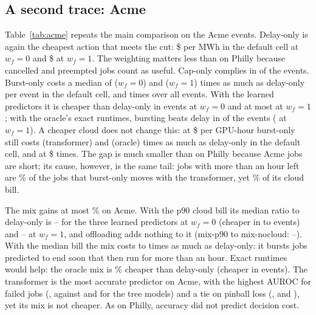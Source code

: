 \subsection{A second trace: Acme}
\label{sec:acme}

Table~\ref{tab:acme} repeats the main comparison on the \AcmeEvents{} Acme events. Delay-only is again the cheapest action that meets the cut: \$\AcmeDefDelayUsdZero{} per MWh in the default cell at $w_f=0$ and \$\AcmeDefDelayUsdOne{} at $w_f=1$. The weighting matters less than on Philly because cancelled and preempted jobs count as useful. Cap-only complies in \AcmeCapCompliantEvents{} of the \AcmeEvents{} events.
Burst-only costs a median of \AcmeBurstOverDelayDefaultZero{} ($w_f=0$) and \AcmeBurstOverDelayDefaultOne{} ($w_f=1$) times as much as delay-only per event in the default cell, and \AcmeBurstOverDelayAllZero{} times over all events. With the learned predictors it is cheaper than delay-only in \AcmeLearnedBurstCheaperMaxZero{} events at $w_f=0$ and at most \AcmeLearnedBurstCheaperMaxOne{} at $w_f=1$; with the oracle's exact runtimes, bursting beats delay in \AcmeOracleBurstCheaperZero{} of the \AcmeEvents{} events (\AcmeOracleBurstCheaperOne{} at $w_f=1$). A cheaper cloud does not change this: at \$\AcmeCheapPrice{} per GPU-hour burst-only still costs \AcmeCheapBurstTransformerOverDelayZero{} (transformer) and \AcmeCheapBurstOracleOverDelayZero{} (oracle) times as much as delay-only in the default cell, and at \$\AcmeHighPrice{} \AcmeHighBurstTransformerOverDelayZero{} times.
The gap is much smaller than on Philly because Acme jobs are short; its cause, however, is the same tail: jobs with more than an hour left are \AcmeBurstLongJobsPct\% of the jobs that burst-only moves with the transformer, yet \AcmeBurstLongUsdPct\% of its cloud bill.

The mix gains at most \AcmeLearnedMixGainMaxPct\% on Acme. With the p90 cloud bill its median ratio to delay-only is \AcmeLearnedMixMinZero{}--\AcmeLearnedMixMaxZero{} for the three learned predictors at $w_f=0$ (cheaper in \AcmeLearnedMixCheaperMinZero{} to \AcmeLearnedMixCheaperMaxZero{} events) and \AcmeLearnedMixMinOne{}--\AcmeLearnedMixMaxOne{} at $w_f=1$, and offloading adds nothing to it (mix-p90 to mix-nocloud: \AcmeLearnedNocloudMinZero{}--\AcmeLearnedNocloudMaxZero{}). With the median bill the mix costs \AcmeLearnedMixPFiveMinZero{} to \AcmeLearnedMixPFiveMaxZero{} times as much as delay-only: it bursts jobs predicted to end soon that then run for more than an hour. Exact runtimes would help: the oracle mix is \AcmeOracleMixGainPctZero\% cheaper than delay-only (cheaper in \AcmeMixPNineOverDelayCheaperOracleZero{} events).
The transformer is the most accurate predictor on Acme, with the highest AUROC for failed jobs (\AcmePredTransformerAuroc{}, against \AcmePredGbdtAuroc{} and \AcmePredLightgbmAuroc{} for the tree models) and a tie on pinball loss (\AcmePredTransformerPinball{}, \AcmePredGbdtPinball{} and \AcmePredLightgbmPinball{}), yet its mix is not cheaper. As on Philly, accuracy did not predict decision cost.

